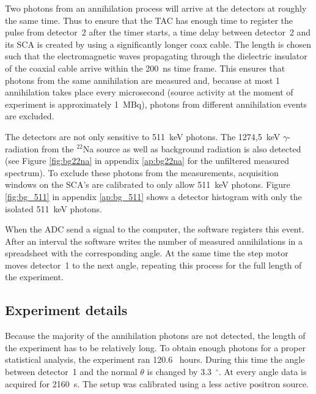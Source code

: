 Two photons from an annihilation process will arrive at the detectors at roughly the same time. Thus to ensure that the TAC has enough time to register the pulse from detector~2 after the timer starts, a time delay between detector~2 and its SCA is created by using a significantly longer coax cable. The length is chosen such that the electromagnetic waves propagating through the dielectric insulator of the coaxial cable arrive within the 200~ns time frame. This ensures that photons from the same annihilation are measured and, because at most 1 annihilation takes place every microsecond (source activity at the moment of experiment is approximately 1~MBq), photons from different annihilation events are excluded.

The detectors are not only sensitive to 511~keV photons. The 1274,5~keV $\gamma$-radiation from the $^{22}$Na source as well as background radiation is also detected (see Figure \ref{fig:bg22na} in appendix \ref{ap:bg22na} for the unfiltered measured spectrum). To exclude these photons from the measurements, acquisition windows on the SCA's are calibrated to only allow 511~keV photons. Figure \ref{fig:bg_511} in appendix \ref{ap:bg_511} shows a detector histogram with only the isolated 511~keV photons.

When the ADC send a signal to the computer, the software registers this event. After an interval the software writes the number of measured annihilations in a spreadsheet with the corresponding angle. At the same time the step motor moves detector~1 to the next angle, repeating this process for the full length of the experiment.

\subsection*{Experiment details}
Because the majority of the annihilation photons are not detected, the length of the experiment has to be relatively long. To obtain enough photons for a proper statistical analysis, the experiment ran 120.6~ hours. During this time the angle between detector~1 and the normal $\theta$ is changed by 3.3~$^{\circ}$. At every angle data is acquired for 2160~s. The setup was calibrated using a less active positron source.